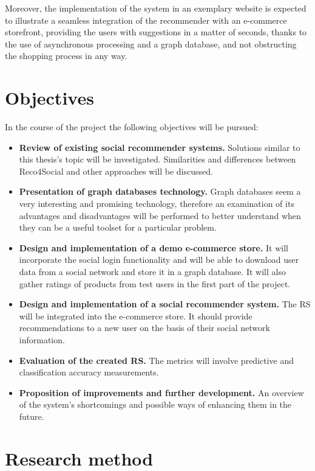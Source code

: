 \documentclass[12pt]{report}
\begin{document}
Moreover, the implementation of the system in an exemplary website is expected to illustrate a seamless integration of the recommender with an e-commerce storefront, providing the users with suggestions in a matter of seconds, thanks to the use of asynchronous processing and a graph database, and not obstructing the shopping process in any way.

\section{Objectives}

In the course of the project the following objectives will be pursued:
\begin{itemize}
\item {\bf Review of existing social recommender systems.} Solutions similar to this thesis's topic will be investigated. Similarities and differences between Reco4Social and other approaches will be discussed.
\item {\bf Presentation of graph databases technology.} Graph databases seem a very interesting and promising technology, therefore an examination of its advantages and disadvantages will be performed to better understand when they can be a useful toolset for a particular problem.
\item {\bf Design and implementation of a demo e-commerce store.} It will incorporate the social login functionality and will be able to download user data from a social network and store it in a graph database. It will also gather ratings of products from test users in the first part of the project.
\item {\bf Design and implementation of a social recommender system.} The RS will be integrated into the e-commerce store. It should provide recommendations to a new user on the basis of their social network information.
\item {\bf Evaluation of the created RS.} The metrics will involve predictive and classification accuracy measurements.
\item {\bf Proposition of improvements and further development.} An overview of the system's shortcomings and possible ways of enhancing them in the future.
\end{itemize}

\section{Research method}
\end{document}
